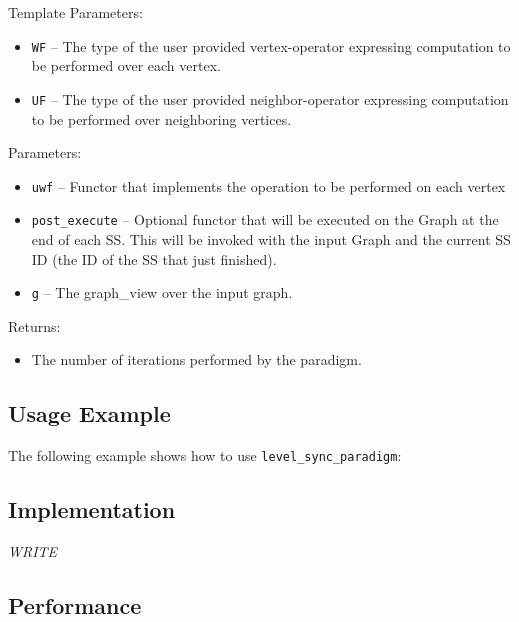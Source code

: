 Template Parameters:
\begin{itemize}
\item
\texttt{WF} --
The type of the user provided vertex-operator expressing computation to be performed over each vertex.
\item
\texttt{UF} --
The type of the user provided neighbor-operator expressing computation to be performed over neighboring vertices.
\end{itemize}

Parameters:
\begin{itemize}
\item
\texttt{uwf} --
Functor that implements the operation to be performed on each vertex
\item
\texttt{post\_execute} --
Optional functor that will be executed on the Graph at the end of each SS. This will be invoked with the input Graph and the current SS ID (the ID of the SS that just finished).
\item
\texttt{g} --
The graph\_view over the input graph.
\end{itemize}

Returns:
\begin{itemize}
\item
The number of iterations performed by the paradigm. 
\end{itemize}

\subsection{Usage Example} \label{sec-level-sync-alg-use}

The following example shows how to use 
\texttt{level\_sync\_paradigm}:


\subsection{Implementation} \label{sec-level-sync-alg-impl}

\textit{WRITE}

\subsection{Performance} \label{sec-level-sync-alg-perf}

